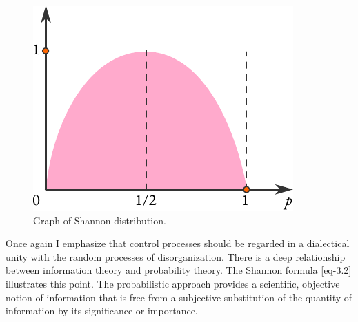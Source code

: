 \begin{figure}
 \centering
 \includegraphics[width=\linewidth]{figures/shannon-distro.pdf}
\caption{Graph of Shannon distribution.\label{shannon-distro}}
 \end{figure}


Once again I emphasize that control processes should be regarded in
a dialectical unity with the random processes of disorganization. There
is a deep relationship between information theory and probability
theory. The Shannon formula \eqref{eq-3.2} illustrates this point. The
probabilistic approach provides a scientific, objective notion of
information that is free from a subjective substitution of the quantity of
information by its significance or importance.



